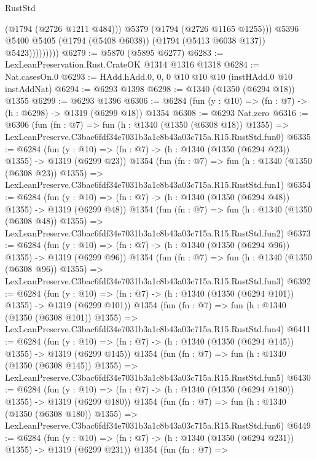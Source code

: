 \begin{lexlean}{RustStd}
\begin{coremodule}
                          (@1794 (@2726 @1211 @484)))
                        @5379
                        (@1794 (@2726 @1165 @1255)))
                      @5396
                      @5400
                      @5405
                      (@1794 (@5408 @6038))
                      (@1794 (@5413 @6038 @137))
                      @5423)))))))))
@6279 := @5870 (@5895 @6277)
@6283 := LexLeanPreservation.Rust.CrateOK @1314 @1316 @1318
@6284 := Nat.casesOn.{0}
@6293 := HAdd.hAdd.{0, 0, 0} @10 @10 @10 (instHAdd.{0} @10 instAddNat)
@6294 := @6293 @1398
@6298 := @1340 (@1350 (@6294 @18)) @1355
@6299 := @6293 @1396
@6306 := @6284 (fun (y : @10) => (fn : @7) -> (h : @6298) -> @1319 (@6299 @18)) @1354
@6308 := @6293 Nat.zero
@6316 := @6306
    (fun (fn : @7) =>
    fun (h : @1340 (@1350 (@6308 @18)) @1355) =>
    LexLeanPreserve.C3bac6fdf34e7031b3a1c8b43a03c715a.R15.RustStd.fun0)
@6335 := @6284
    (fun (y : @10) => (fn : @7) -> (h : @1340 (@1350 (@6294 @23)) @1355) -> @1319 (@6299 @23))
    @1354
    (fun (fn : @7) =>
    fun (h : @1340 (@1350 (@6308 @23)) @1355) =>
    LexLeanPreserve.C3bac6fdf34e7031b3a1c8b43a03c715a.R15.RustStd.fun1)
@6354 := @6284
    (fun (y : @10) => (fn : @7) -> (h : @1340 (@1350 (@6294 @48)) @1355) -> @1319 (@6299 @48))
    @1354
    (fun (fn : @7) =>
    fun (h : @1340 (@1350 (@6308 @48)) @1355) =>
    LexLeanPreserve.C3bac6fdf34e7031b3a1c8b43a03c715a.R15.RustStd.fun2)
@6373 := @6284
    (fun (y : @10) => (fn : @7) -> (h : @1340 (@1350 (@6294 @96)) @1355) -> @1319 (@6299 @96))
    @1354
    (fun (fn : @7) =>
    fun (h : @1340 (@1350 (@6308 @96)) @1355) =>
    LexLeanPreserve.C3bac6fdf34e7031b3a1c8b43a03c715a.R15.RustStd.fun3)
@6392 := @6284
    (fun (y : @10) => (fn : @7) -> (h : @1340 (@1350 (@6294 @101)) @1355) -> @1319 (@6299 @101))
    @1354
    (fun (fn : @7) =>
    fun (h : @1340 (@1350 (@6308 @101)) @1355) =>
    LexLeanPreserve.C3bac6fdf34e7031b3a1c8b43a03c715a.R15.RustStd.fun4)
@6411 := @6284
    (fun (y : @10) => (fn : @7) -> (h : @1340 (@1350 (@6294 @145)) @1355) -> @1319 (@6299 @145))
    @1354
    (fun (fn : @7) =>
    fun (h : @1340 (@1350 (@6308 @145)) @1355) =>
    LexLeanPreserve.C3bac6fdf34e7031b3a1c8b43a03c715a.R15.RustStd.fun5)
@6430 := @6284
    (fun (y : @10) => (fn : @7) -> (h : @1340 (@1350 (@6294 @180)) @1355) -> @1319 (@6299 @180))
    @1354
    (fun (fn : @7) =>
    fun (h : @1340 (@1350 (@6308 @180)) @1355) =>
    LexLeanPreserve.C3bac6fdf34e7031b3a1c8b43a03c715a.R15.RustStd.fun6)
@6449 := @6284
    (fun (y : @10) => (fn : @7) -> (h : @1340 (@1350 (@6294 @231)) @1355) -> @1319 (@6299 @231))
    @1354
    (fun (fn : @7) =>

\end{coremodule}
\end{lexlean}
